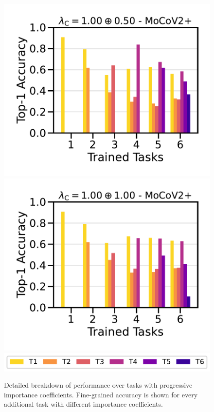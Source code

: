 \begin{figure}[ht]
    \includegraphics[width=0.24 \linewidth ]{figures_new/Part_3/F4-WISDM2019-__lambda___mathrm_C__=1.00_oplus0.50_-MoCoV2+-6Tasks-v2.pdf}
    \includegraphics[width=0.24 \linewidth ]{figures_new/Part_3/F4-WISDM2019-__lambda___mathrm_C__=1.00_oplus1.00_-MoCoV2+-6Tasks-v2.pdf} \\
    \vspace{-0.05in}
    \includegraphics[width=0.65 \linewidth ]{figures_new/Part_1/F4-WISDM2019-6Tasks-v2_legend.pdf}
    \vspace{-0.1in}
    
    \caption{Detailed breakdown of performance over tasks with progressive importance coefficients. Fine-grained accuracy is shown for every additional task with different importance coefficients.}
    \vspace{-0.2in}
    \label{fig:kaizen_performance_per_task_progressive_lamb}
\end{figure}

